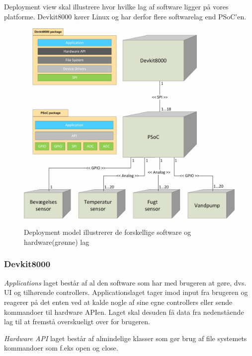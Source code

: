 
Deployment view skal illustrere hvor hvilke lag af software ligger på vores platforme. Devkit8000 kører Linux og har derfor flere softwarelag end PSoC'en.
 
\vspace{15 mm}

\begin{figure}[htbp] \centering
{\includegraphics[scale=0.7]{filer/systemarkitektur/Deployment_model}}
\caption{Deployment model illustrerer de forskellige software og hardware(grønne) lag}
\label{fig:Deployment Model}
\end{figure}

\vspace{5 mm}

\subsubsection{Devkit8000}
\textit{Applications} laget består af al den software som har med brugeren at gøre, dvs. UI og tilhørende controllers. Applicationslaget tager imod input fra brugeren og reagerer på det enten ved at kalde nogle af sine egne controllers eller sende kommandoer til hardware APIen. Laget skal desuden få data fra nedenstående lag til at fremstå overskueligt over for brugeren.

\clearpage

\textit{Hardware API} laget består af almindelige klasser som gør brug af file systemets kommandoer som f.eks open og close.

